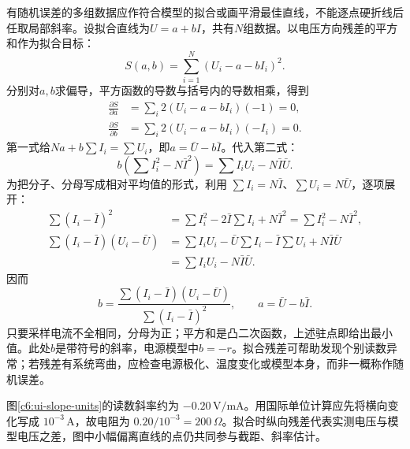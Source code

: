 有随机误差的多组数据应作符合模型的拟合或画平滑最佳直线，不能逐点硬折线后任取局部斜率。设拟合直线为$U=a+bI$，共有$N$组数据。以电压方向残差的平方和作为拟合目标：
\[
S(a,b)=\sum_{i=1}^N(U_i-a-bI_i)^2.
\]
分别对$a,b$求偏导，平方函数的导数与括号内的导数相乘，得到
\begin{align*}
\frac{\partial S}{\partial a}
&=\sum_i2(U_i-a-bI_i)(-1)=0,\\
\frac{\partial S}{\partial b}
&=\sum_i2(U_i-a-bI_i)(-I_i)=0.
\end{align*}
第一式给$Na+b\sum I_i=\sum U_i$，即$a=\bar U-b\bar I$。代入第二式：
\[
b\left(\sum I_i^2-N\bar I^2\right)
=\sum I_iU_i-N\bar I\bar U.
\]
为把分子、分母写成相对平均值的形式，利用 $\sum I_i=N\bar I$、$\sum U_i=N\bar U$，逐项展开：
\[
 \begin{aligned}
 \sum(I_i-\bar I)^2
 &=\sum I_i^2-2\bar I\sum I_i+N\bar I^2
 =\sum I_i^2-N\bar I^2,\\
 \sum(I_i-\bar I)(U_i-\bar U)
 &=\sum I_iU_i-\bar U\sum I_i-\bar I\sum U_i+N\bar I\bar U\\
 &=\sum I_iU_i-N\bar I\bar U.
 \end{aligned}
\]
因而
\[
b=\frac{\sum(I_i-\bar I)(U_i-\bar U)}{\sum(I_i-\bar I)^2},
\qquad a=\bar U-b\bar I.
\]
只要采样电流不全相同，分母为正；平方和是凸二次函数，上述驻点即给出最小值。此处$b$是带符号的斜率，电源模型中$b=-r$。拟合残差可帮助发现个别读数异常；若残差有系统弯曲，应检查电源极化、温度变化或模型本身，而非一概称作随机误差。


图\ref{c6:ui-slope-units}的读数斜率约为 $-0.20\,\mathrm{V/mA}$。用国际单位计算应先将横向变化写成 $10^{-3}\,\mathrm A$，故电阻为 $0.20/10^{-3}=200\,\Omega$。拟合时纵向残差代表实测电压与模型电压之差，图中小幅偏离直线的点仍共同参与截距、斜率估计。


